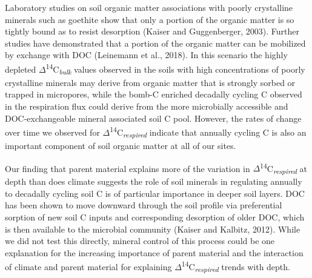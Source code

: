 \documentclass[english,man,floatsintext]{apa6}
\begin{document}
Laboratory studies on soil organic matter associations with poorly crystalline minerals such as goethite show that only a portion of the organic matter is so tightly bound as to resist desorption (Kaiser and Guggenberger, 2003). Further studies have demonstrated that a portion of the organic matter can be mobilized by exchange with DOC (Leinemann et al., 2018). In this scenario the highly depleted \(\Delta\)\textsuperscript{14}C\textsubscript{\emph{bulk}} values observed in the soils with high concentrations of poorly crystalline minerals may derive from organic matter that is strongly sorbed or trapped in micropores, while the bomb-C enriched decadally cycling C observed in the respiration flux could derive from the more microbially accessible and DOC-exchangeable mineral associated soil C pool. However, the rates of change over time we observed for \(\Delta\)\textsuperscript{14}C\textsubscript{\emph{respired}} indicate that annually cycling C is also an important component of soil organic matter at all of our sites.

Our finding that parent material explains more of the variation in \(\Delta\)\textsuperscript{14}C\textsubscript{\emph{respired}} at depth than does climate suggests the role of soil minerals in regulating annually to decadally cycling soil C is of particular importance in deeper soil layers. DOC has been shown to move downward through the soil profile via preferential sorption of new soil C inputs and corresponding desorption of older DOC, which is then available to the microbial community (Kaiser and Kalbitz, 2012). While we did not test this directly, mineral control of this process could be one explanation for the increasing importance of parent material and the interaction of climate and parent material for explaining \(\Delta\)\textsuperscript{14}C\textsubscript{\emph{respired}} trends with depth.
\end{document}
